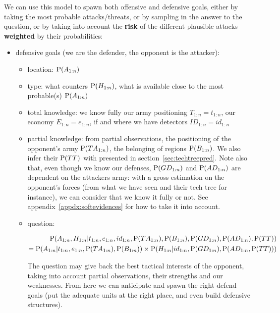 We can use this model to spawn both offensive and defensive goals, either by taking the most probable attacks/threats, or by sampling in the answer to the question, or by taking into account the \textbf{risk} of the different plausible attacks \textbf{weighted} by their probabilities: %
\begin{itemize}
    \item defensive goals (we are the defender, the opponent is the attacker):
    \begin{itemize}
        \item location: $\mathrm{P}(A_{1:n})$
        \item type: what counters $\mathrm{P}(H_{1:n})$, what is available close to the most probable(s) $\mathrm{P}(A_{1:n})$
        \item total knowledge: we know fully our army positioning $T_{1:n}=t_{1:n}$, our economy $E_{1:n}=e_{1:n}$, if and where we have detectors $ID_{1:n}=id_{1:n}$
        \item partial knowledge: from partial observations, the positioning of the opponent's army $\mathrm{P}(TA_{1:n})$, the belonging of regions $\mathrm{P}(B_{1:n})$. We also infer their  $\mathrm{P}(TT)$ with \citep{SYNNAEVE:StratPred} presented in section~\ref{sec:techtreepred}. Note also that, even though we know our defenses, $\mathrm{P}(GD_{1:n})$ and $\mathrm{P}(AD_{1:n})$ are dependent on the attackers army: with a gross estimation on the opponent's forces (from what we have seen and their tech tree for instance), we can consider that we know it fully or not. See appendix~\ref{appdx:softevidences} for how to take it into account.
        \item question:
\begin{small}
\begin{eqnarray*}
\mathrm{P}(A_{1:n},H_{1:n}|t_{1:n},e_{1:n},id_{1:n},\mathrm{P}(TA_{1:n}),\mathrm{P}(B_{1:n}),\mathrm{P}(GD_{1:n}),\mathrm{P}(AD_{1:n}),\mathrm{P}(TT))\\
= \mathrm{P}(A_{1:n}|t_{1:n},e_{1:n},\mathrm{P}(TA_{1:n}),\mathrm{P}(B_{1:n}))\times \mathrm{P}(H_{1:n}|id_{1:n},\mathrm{P}(GD_{1:n}),\mathrm{P}(AD_{1:n},\mathrm{P}(TT)))
\end{eqnarray*}
\end{small}
The question may give back the best tactical interests of the opponent, taking into account partial observations, their strengths and our weaknesses. From here we can anticipate and spawn the right defend goals (put the adequate units at the right place, and even build defensive structures). 
    \end{itemize}


\end{itemize}
